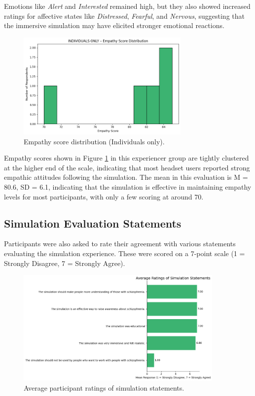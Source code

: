 Emotions like \textit{Alert} and \textit{Interested} remained high, but they also showed increased ratings for affective states like \textit{Distressed}, \textit{Fearful}, and \textit{Nervous}, suggesting that the immersive simulation may have elicited stronger emotional reactions.

\begin{figure}[htbp]
    \centering
    \includegraphics[width=0.75\textwidth]{../../Figures/empathy-score-post-indiv.png}
    \caption{Empathy score distribution (Individuals only).}
    \label{fig:empathy_indiv_post}
\end{figure}

\vspace{1em}

Empathy scores shown in Figure \ref{fig:empathy_indiv_post} in this experiencer group are tightly clustered at the higher end of the scale, indicating that most headset users reported strong empathic attitudes following the simulation. The mean in this evaluation is M = 80.6, SD = 6.1, indicating that the simulation is effective in maintaining empathy levels for most participants, with only a few scoring at around 70.

\subsection{Simulation Evaluation Statements}

Participants were also asked to rate their agreement with various statements evaluating the simulation experience. These were scored on a 7-point scale (1 = Strongly Disagree, 7 = Strongly Agree).

\begin{figure}[H]
    \centering
    \includegraphics[width=0.9\textwidth]{../../Figures/simulation-evaluation-post.png}
    \caption{Average participant ratings of simulation statements.}
    \label{fig:simulation_evaluation_post}
\end{figure}


